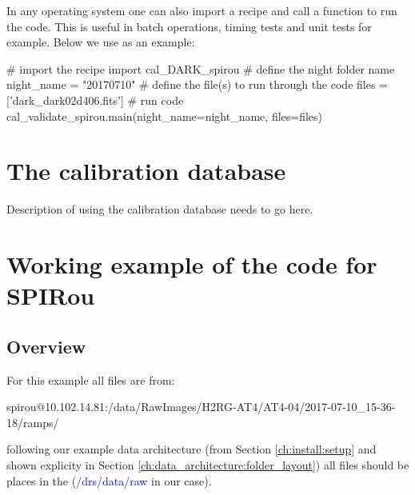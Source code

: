 In any operating system one can also import a recipe and call a function to run the code. This is useful in batch operations, timing tests and unit tests for example. Below we use \calDARK as an example:

\begin{pythonbox}
# import the recipe
import cal_DARK_spirou
# define the night folder name
night_name = "20170710"
# define the file(s) to run through the code
files = ['dark_dark02d406.fits']
# run code
cal_validate_spirou.main(night_name=night_name, files=files)
\end{pythonbox}


\section{The calibration database}
\label{chapter:using_the_drs:calibdb}

\begin{todo}
Description of using the calibration database needs to go here.
\end{todo}


\section{Working example of the code for SPIRou}
\label{chapter:using_the_drs:working_example}

\subsection{Overview}
\label{chapter:using_the_drs:working_example:overview}

For this example all files are from:
\begin{cmdbox}
spirou@10.102.14.81:/data/RawImages/H2RG-AT4/AT4-04/2017-07-10_15-36-18/ramps/
\end{cmdbox} 

\noindent following our example data architecture (from Section \ref{ch:install:setup} and shown explicity in Section \ref{ch:data_architecture:folder_layout}) all files should be places in the  (\textcolor{blue}{/drs/data/raw} in our case).

